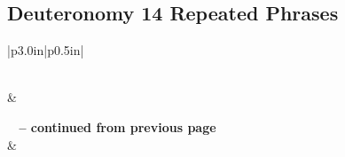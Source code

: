 \subsection{Deuteronomy 14 Repeated Phrases}


\normalsize
 
\begin{center}
\begin{longtable}{|p{3.0in}|p{0.5in}|}
\caption[Deuteronomy 14 Repeated Phrases]{Deuteronomy 14 Repeated Phrases}\label{table:Repeated Phrases Deuteronomy 14} \\
\hline {} &  \\ \hline 
\endfirsthead
 
{{\bfseries \tablename\ \thetable{} -- continued from previous page}} \\  
\hline {} &  \\ \hline 
\endhead
 

\end{longtable}
\end{center}

